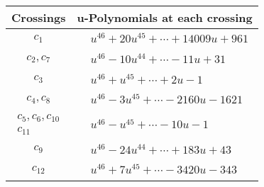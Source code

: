 \documentclass[1p]{elsarticle_modified}
\theoremstyle{definition}
\begin{document}
\begin{tabular}{m{50pt}|m{274pt}}
Crossings & \hspace{64pt}u-Polynomials at each crossing \\
\hline $$\begin{aligned}c_{1}\end{aligned}$$&$\begin{aligned}
&u^{46}+20 u^{45}+\cdots+14009 u+961
\end{aligned}$\\
\hline $$\begin{aligned}c_{2},c_{7}\end{aligned}$$&$\begin{aligned}
&u^{46}-10 u^{44}+\cdots-11 u+31
\end{aligned}$\\
\hline $$\begin{aligned}c_{3}\end{aligned}$$&$\begin{aligned}
&u^{46}+u^{45}+\cdots+2 u-1
\end{aligned}$\\
\hline $$\begin{aligned}c_{4},c_{8}\end{aligned}$$&$\begin{aligned}
&u^{46}-3 u^{45}+\cdots-2160 u-1621
\end{aligned}$\\
\hline $$\begin{aligned}c_{5},c_{6},c_{10}\\c_{11}\end{aligned}$$&$\begin{aligned}
&u^{46}- u^{45}+\cdots-10 u-1
\end{aligned}$\\
\hline $$\begin{aligned}c_{9}\end{aligned}$$&$\begin{aligned}
&u^{46}-24 u^{44}+\cdots+183 u+43
\end{aligned}$\\
\hline $$\begin{aligned}c_{12}\end{aligned}$$&$\begin{aligned}
&u^{46}+7 u^{45}+\cdots-3420 u-343
\end{aligned}$\\
\hline
\end{tabular}\\~\\
\end{document}
